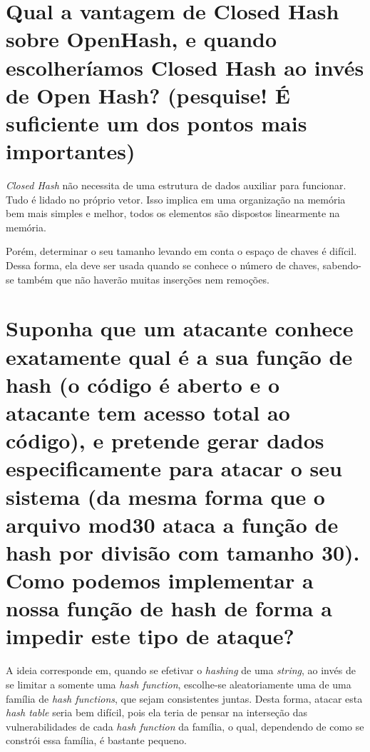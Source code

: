 \documentclass{article}[twocolumn]
\begin{document}
	\section{Qual a vantagem de Closed Hash sobre OpenHash, e quando escolheríamos
	Closed Hash ao invés de Open Hash? (pesquise! É suficiente um dos pontos mais importantes)}
	\textit{Closed Hash} n\~ao necessita de uma estrutura de dados auxiliar para funcionar.
	Tudo \'e lidado no pr\'oprio vetor. Isso implica em uma organiza\c{c}\~ao na mem\'oria
	bem mais simples e melhor, todos os elementos s\~ao dispostos linearmente na mem\'oria.

	Por\'em, determinar o seu tamanho levando em conta o espa\c{c}o de chaves \'e dif\'icil.
	Dessa forma, ela deve ser usada quando se conhece o n\'umero de chaves, sabendo-se tamb\'em
	que n\~ao haver\~ao muitas inser\c{c}\~oes nem remo\c{c}\~oes.

	\section{Suponha que um atacante conhece exatamente qual é a sua função de hash (o código é
	aberto e o atacante tem acesso total ao código), e pretende gerar dados especificamente
	para atacar o seu sistema (da mesma forma que o arquivo mod30 ataca a função de hash
	por divisão com tamanho 30).  Como podemos implementar a nossa função de hash de
	forma a impedir este tipo de ataque?}
	A ideia corresponde em, quando se efetivar o \textit{hashing} de uma \textit{string},
	ao inv\'es de se limitar a somente uma \textit{hash function}, escolhe-se aleatoriamente
	uma de uma fam\'ilia de \textit{hash functions}, que sejam consistentes juntas. Desta
	forma, atacar esta \textit{hash table} seria bem dif\'icil, pois ela teria de pensar na
	interse\c{c}\~ao das vulnerabilidades de cada \textit{hash function} da fam\'ilia, o qual,
	dependendo de como se constr\'oi essa fam\'ilia, \'e bastante pequeno.
\end{document}
